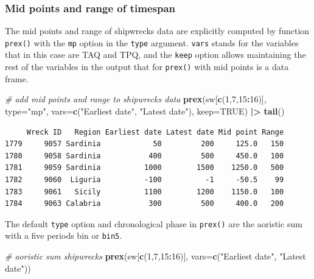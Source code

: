 \documentclass[a4paper,11pt]{memoir}
\newenvironment{Shaded}{\begin{snugshade}}{\end{snugshade}}
\newcommand{\CommentTok}[1]{\textcolor[rgb]{0.56,0.35,0.01}{\textit{#1}}}
\newcommand{\DataTypeTok}[1]{\textcolor[rgb]{0.13,0.29,0.53}{#1}}
\newcommand{\DecValTok}[1]{\textcolor[rgb]{0.00,0.00,0.81}{#1}}
\newcommand{\ErrorTok}[1]{\textcolor[rgb]{0.64,0.00,0.00}{\textbf{#1}}}
\newcommand{\KeywordTok}[1]{\textcolor[rgb]{0.13,0.29,0.53}{\textbf{#1}}}
\newcommand{\NormalTok}[1]{#1}
\newcommand{\OperatorTok}[1]{\textcolor[rgb]{0.81,0.36,0.00}{\textbf{#1}}}
\newcommand{\OtherTok}[1]{\textcolor[rgb]{0.56,0.35,0.01}{#1}}
\newcommand{\StringTok}[1]{\textcolor[rgb]{0.31,0.60,0.02}{#1}}
\begin{document}
\hypertarget{mid-points-and-range-of-timespan}{%
\subsubsection{Mid points and range of
timespan}\label{mid-points-and-range-of-timespan}}

The mid points and range of shipwrecks data are explicitly computed by
function \texttt{prex()} with the \texttt{mp} option in the
\texttt{\textquotesingle{}type\textquotesingle{}} argument.
\texttt{\textquotesingle{}vars\textquotesingle{}} stands for the
variables that in this case are TAQ and TPQ, and the
\texttt{\textquotesingle{}keep\textquotesingle{}} option allows
maintaining the rest of the variables in the output that for
\texttt{prex()} with mid points is a data frame.

\begin{Shaded}
\begin{Highlighting}[]
\CommentTok{# add mid points and range to shipwrecks data}
\KeywordTok{prex}\NormalTok{(sw[}\KeywordTok{c}\NormalTok{(}\DecValTok{1}\NormalTok{,}\DecValTok{7}\NormalTok{,}\DecValTok{15}\OperatorTok{:}\DecValTok{16}\NormalTok{)], }\DataTypeTok{type=}\StringTok{"mp"}\NormalTok{, }\DataTypeTok{vars=}\KeywordTok{c}\NormalTok{(}\StringTok{"Earliest date"}\NormalTok{, }\StringTok{"Latest date"}\NormalTok{), }\DataTypeTok{keep=}\OtherTok{TRUE}\NormalTok{) }\OperatorTok{|}\ErrorTok{>}\StringTok{ }
\StringTok{  }\KeywordTok{tail}\NormalTok{()}
\end{Highlighting}
\end{Shaded}

\begin{verbatim}
     Wreck ID   Region Earliest date Latest date Mid point Range
1779     9057 Sardinia            50         200     125.0   150
1780     9058 Sardinia           400         500     450.0   100
1781     9059 Sardinia          1000        1500    1250.0   500
1782     9060  Liguria          -100          -1     -50.5    99
1783     9061   Sicily          1100        1200    1150.0   100
1784     9063 Calabria           300         500     400.0   200
\end{verbatim}

The default \texttt{\textquotesingle{}type\textquotesingle{}} option and
chronological phase in \texttt{prex()} are the aoristic sum with a five
periods bin or \texttt{bin5}.

\begin{Shaded}
\begin{Highlighting}[]
\CommentTok{# aoristic sum shipwrecks}
\KeywordTok{prex}\NormalTok{(sw[}\KeywordTok{c}\NormalTok{(}\DecValTok{1}\NormalTok{,}\DecValTok{7}\NormalTok{,}\DecValTok{15}\OperatorTok{:}\DecValTok{16}\NormalTok{)], }\DataTypeTok{vars=}\KeywordTok{c}\NormalTok{(}\StringTok{"Earliest date"}\NormalTok{, }\StringTok{"Latest date"}\NormalTok{))}
\end{Highlighting}
\end{Shaded}
\end{document}
